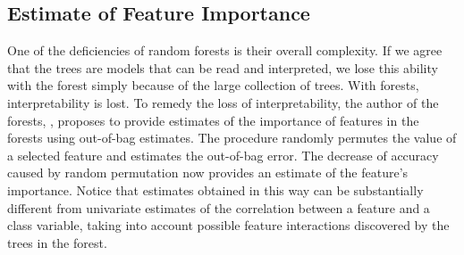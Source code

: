 \begin{refsection}
\subsection*{Estimate of Feature Importance}

One of the deficiencies of random forests is their overall complexity. If we agree that the trees are models that can be read and interpreted, we lose this ability with the forest simply because of the large collection of trees. With forests, interpretability is lost. To remedy the loss of interpretability, the author of the forests, \citet{Brieman2001}, proposes to provide estimates of the importance of features in the forests using out-of-bag estimates. The procedure randomly permutes the value of a selected feature and estimates the out-of-bag error. The decrease of accuracy caused by random permutation now provides an estimate of the feature's importance. Notice that estimates obtained in this way can be substantially different from univariate estimates of the correlation between a feature and a class variable, taking into account possible feature interactions discovered by the trees in the forest.


\printbibliography[heading=subbibliography]
\end{refsection}
